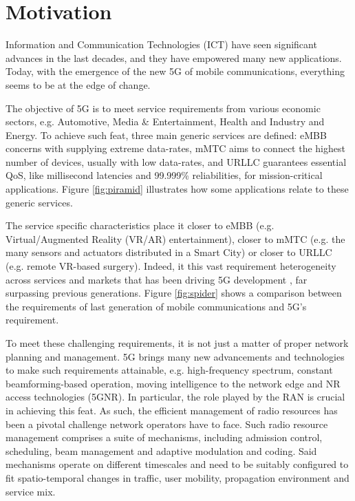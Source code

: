 \section{Motivation}
\label{sec:intro}

Information and Communication Technologies (ICT) have seen significant advances in the last decades, and they have empowered many new applications. Today, with the emergence of the new \ac{5G} of mobile communications, everything seems to be at the edge of change.

The objective of \ac{5G} is to meet service requirements from various economic sectors, e.g. Automotive, Media \& Entertainment, Health and Industry and Energy. To achieve such feat, three main generic services are defined: \ac{eMBB} concerns with supplying extreme data-rates, \ac{mMTC} aims to connect the highest number of devices, usually with low data-rates, and \ac{URLLC} guarantees essential \ac{QoS}, like millisecond latencies and 99.999\% reliabilities, for mission-critical applications. Figure \ref{fig:piramid} illustrates how some applications relate to these generic services.


The service specific characteristics place it closer to \ac{eMBB} (e.g. Virtual/Augmented Reality (VR/AR) entertainment), closer to \ac{mMTC} (e.g. the many sensors and actuators distributed in a Smart City) or closer to \ac{URLLC} (e.g. remote VR-based surgery). Indeed, it this vast requirement heterogeneity across services and markets that has been driving 5G development \cite{5g_2020}, far surpassing previous generations. Figure \ref{fig:spider} shows a comparison between the requirements of last generation of mobile communications and 5G's requirement.


To meet these challenging requirements, it is not just a matter of proper network planning and management. 5G brings many new advancements and technologies to make such requirements attainable, e.g. high-frequency spectrum, constant beamforming-based operation, moving intelligence to the network edge and \ac{NR} access technologies (5GNR). In particular, the role played by the \ac{RAN} is crucial in achieving this feat. As such, the efficient management of radio resources has been a pivotal challenge network operators have to face. Such radio resource management comprises a suite of mechanisms, including admission control, scheduling, beam management and adaptive modulation and coding. Said mechanisms operate on different timescales and need to be suitably configured to fit spatio-temporal changes in traffic, user mobility, propagation environment and service mix.

